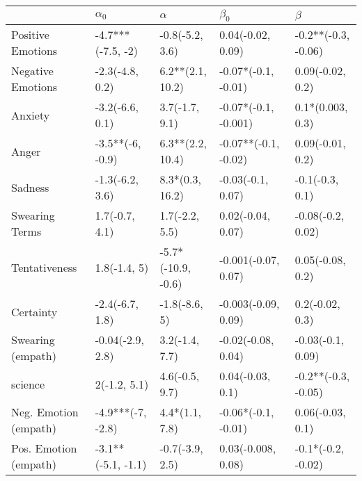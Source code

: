 \begin{tabular}{lllll}
\toprule
{} &          $\alpha_0$ &            $\alpha$ &             $\beta_0$ &              $\beta$ \\
\midrule
Positive Emotions     &   -4.7***(-7.5, -2) &     -0.8(-5.2, 3.6) &     0.04(-0.02, 0.09) &  -0.2**(-0.3, -0.06) \\
Negative Emotions     &     -2.3(-4.8, 0.2) &    6.2**(2.1, 10.2) &   -0.07*(-0.1, -0.01) &     0.09(-0.02, 0.2) \\
Anxiety               &     -3.2(-6.6, 0.1) &      3.7(-1.7, 9.1) &  -0.07*(-0.1, -0.001) &     0.1*(0.003, 0.3) \\
Anger                 &    -3.5**(-6, -0.9) &    6.3**(2.2, 10.4) &  -0.07**(-0.1, -0.02) &     0.09(-0.01, 0.2) \\
Sadness               &     -1.3(-6.2, 3.6) &     8.3*(0.3, 16.2) &     -0.03(-0.1, 0.07) &      -0.1(-0.3, 0.1) \\
Swearing Terms        &      1.7(-0.7, 4.1) &      1.7(-2.2, 5.5) &     0.02(-0.04, 0.07) &    -0.08(-0.2, 0.02) \\
Tentativeness         &        1.8(-1.4, 5) &  -5.7*(-10.9, -0.6) &   -0.001(-0.07, 0.07) &     0.05(-0.08, 0.2) \\
Certainty             &     -2.4(-6.7, 1.8) &       -1.8(-8.6, 5) &   -0.003(-0.09, 0.09) &      0.2(-0.02, 0.3) \\
Swearing (empath)     &    -0.04(-2.9, 2.8) &      3.2(-1.4, 7.7) &    -0.02(-0.08, 0.04) &    -0.03(-0.1, 0.09) \\
science               &        2(-1.2, 5.1) &      4.6(-0.5, 9.7) &      0.04(-0.03, 0.1) &  -0.2**(-0.3, -0.05) \\
Neg. Emotion (empath) &   -4.9***(-7, -2.8) &      4.4*(1.1, 7.8) &   -0.06*(-0.1, -0.01) &     0.06(-0.03, 0.1) \\
Pos. Emotion (empath) &  -3.1**(-5.1, -1.1) &     -0.7(-3.9, 2.5) &    0.03(-0.008, 0.08) &   -0.1*(-0.2, -0.02) \\
\bottomrule
\end{tabular}
